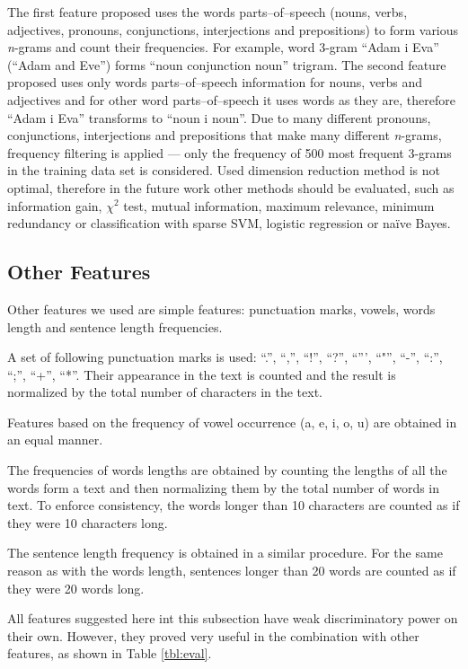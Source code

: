 \documentclass{llncs}
\begin{document}
The first feature proposed uses the words parts--of--speech
(nouns, verbs, adjectives, pronouns, conjunctions, interjections and
prepositions) to form various \emph{n}-grams and count their frequencies. For
example, word 3-gram ``Adam i Eva'' (``Adam and Eve'') forms ``noun
conjunction noun'' trigram. The second feature proposed uses only words
parts--of--speech information for nouns, verbs and adjectives and for other word
parts--of--speech it uses words as they are, therefore ``Adam i Eva'' transforms
to ``noun i noun''. Due to many different pronouns, conjunctions, interjections
and prepositions that make many different \emph{n}-grams, frequency filtering
is applied --- only the frequency of 500 most frequent 3-grams in the
training data set is considered. Used dimension reduction method is not optimal,
therefore in the future work other methods should be evaluated, such as information
gain, $\chi^2$ test, mutual information, maximum relevance, minimum redundancy
or classification with sparse SVM, logistic regression or na\"ive Bayes.

\subsection{Other Features}
\label{sec:znacajke-manje}
Other features we used are simple features: punctuation marks, vowels, words
length and sentence length frequencies.

A set of following punctuation marks is used: ``.'', ``,'', ``!'', ``?'',
``''', ``"'', ``-'', ``:'', ``;'', ``+'', ``*''. Their appearance in the text is counted and
the result is normalized by the total number of characters in the text. 

Features based on the frequency of vowel occurrence (a, e, i, o, u) are
obtained in an equal manner.

The frequencies of words lengths are obtained by counting the lengths of all
the words form a text and then normalizing them by the total number of words in
text. To enforce consistency, the words longer than 10 characters are counted as
if they were 10 characters long.

The sentence length frequency is obtained in a similar procedure.
For the same reason as with the words length, sentences longer than 20 words are
counted as if they were 20 words long.

All features suggested here int this subsection have weak discriminatory power
on their own. However, they proved very useful in the combination with other features, as
shown in Table \ref{tbl:eval}.
\end{document}
